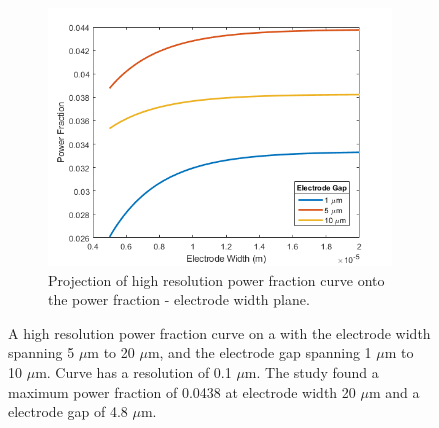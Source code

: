\begin{figure}[h]
\begin{subfigure}[b]{0.49\textwidth}
    \end{subfigure}
    \hfill
    \begin{subfigure}[b]{0.49\textwidth}
        \centering
        \includegraphics[width=\textwidth]{images/hiResPowerVsWidth.png}
        \caption{Projection of high resolution power fraction curve onto the power fraction - electrode width plane.}
    \end{subfigure}
    \caption[Analytic Sensitivity]{A high resolution power fraction curve on a with the electrode width spanning 5 $\mu$m to 20 $\mu$m, and the electrode gap spanning 1 $\mu$m to 10 $\mu$m. Curve has a resolution of 0.1 $\mu$m. The study found a maximum power fraction of 0.0438 at electrode width 20 $\mu$m and a electrode gap of 4.8 $\mu$m.}
    \label{fig:analytic_sensitivity}
\end{figure}


